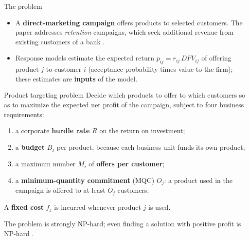 \documentclass[10pt,aspectratio=169]{beamer}
\begin{document}
\begin{frame}{The problem}
  \vspace{-4pt}
  \small
  \begin{itemize}
    \item A \textbf{direct-marketing campaign} offers products to selected customers. The paper addresses
          \emph{retention} campaigns, which seek additional revenue from existing customers of a bank
          \cite{tallanobibon2011}.
    \item Response models estimate the expected return $p_{ij}=r_{ij}\,DFV_{ij}$ of offering product $j$ to customer $i$
          (acceptance probability times value to the firm); these estimates are \textbf{inputs} of the model.
  \end{itemize}
  \begin{block}{Product targeting problem}
    \small Decide which products to offer to which customers so as to maximize the expected net profit of the campaign,
    subject to four business requirements:
    \begin{enumerate}
      \item a corporate \textbf{hurdle rate} $R$ on the return on investment;
      \item a \textbf{budget} $B_j$ per product, because each business unit funds its own product;
      \item a maximum number $M_i$ of \textbf{offers per customer};
      \item a \textbf{minimum-quantity commitment} (MQC) $O_j$: a product used in the campaign is offered to at least $O_j$ customers.
    \end{enumerate}
    A \textbf{fixed cost} $f_j$ is incurred whenever product $j$ is used.
  \end{block}
  \vspace{-4pt}\footnotesize The problem is strongly NP-hard; even finding a solution with positive profit is NP-hard \cite{tallanobibon2011}.
\end{frame}
\end{document}
